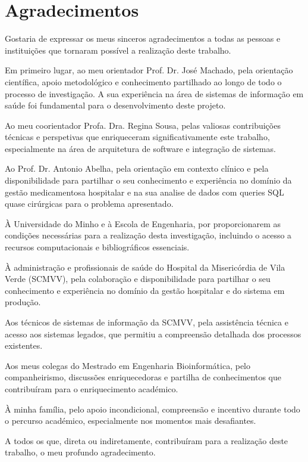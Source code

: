 \chapter*{Agradecimentos}

Gostaria de expressar os meus sinceros agradecimentos a todas as pessoas e instituições que tornaram possível a realização deste trabalho.

Em primeiro lugar, ao meu orientador Prof. Dr. José Machado, pela orientação científica, apoio metodológico e conhecimento partilhado ao longo de todo o processo de investigação. A sua experiência na área de sistemas de informação em saúde foi fundamental para o desenvolvimento deste projeto.

Ao meu coorientador Profa. Dra. Regina Sousa, pelas valiosas contribuições técnicas e perspetivas que enriqueceram significativamente este trabalho, especialmente na área de arquitetura de software e integração de sistemas.

Ao Prof. Dr. Antonio Abelha, pela orientação em contexto clínico e pela disponibilidade para partilhar o seu conhecimento e experiência no domínio da gestão medicamentosa hospitalar e na sua analise de dados com queries SQL quase cirúrgicas para o problema apresentado.

À Universidade do Minho e à Escola de Engenharia, por proporcionarem as condições necessárias para a realização desta investigação, incluindo o acesso a recursos computacionais e bibliográficos essenciais.

À administração e profissionais de saúde do Hospital da Misericórdia de Vila Verde (SCMVV), pela colaboração e disponibilidade para partilhar o seu conhecimento e experiência no domínio da gestão hospitalar e do sistema em produção.

Aos técnicos de sistemas de informação da SCMVV, pela assistência técnica e acesso aos sistemas legados, que permitiu a compreensão detalhada dos processos existentes.

Aos meus colegas do Mestrado em Engenharia Bioinformática, pelo companheirismo, discussões enriquecedoras e partilha de conhecimentos que contribuíram para o enriquecimento académico.

À minha família, pelo apoio incondicional, compreensão e incentivo durante todo o percurso académico, especialmente nos momentos mais desafiantes.

A todos os que, direta ou indiretamente, contribuíram para a realização deste trabalho, o meu profundo agradecimento.

\cleardoublepage 